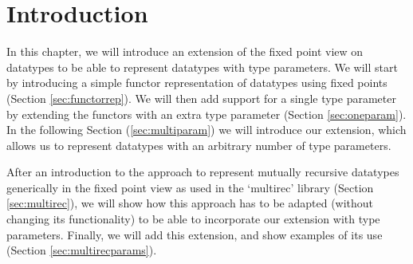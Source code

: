 \section{Introduction}

In this chapter, we will introduce an extension of the fixed point
view on datatypes to be able to represent datatypes with type
parameters. We will start by introducing a simple functor
representation of datatypes using fixed points (Section
\ref{sec:functorrep}). We will then add support for a single type
parameter by extending the functors with an extra type parameter
(Section \ref{sec:oneparam}). In the following Section
(\ref{sec:multiparam}) we will introduce our extension, which allows
us to represent datatypes with an arbitrary number of type parameters.

After an introduction to the approach to represent mutually recursive
datatypes generically in the fixed point view \cite{multirec} as used
in the `multirec' library (Section \ref{sec:multirec}), we will show
how this approach has to be adapted (without changing its
functionality) to be able to incorporate our extension with type
parameters. Finally, we will add this extension, and show examples of
its use (Section \ref{sec:multirecparams}).
